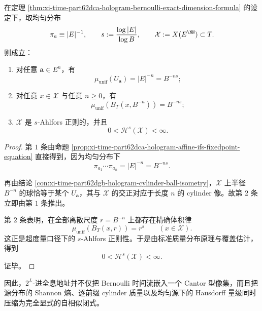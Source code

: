 \begin{corollary}\label{cor:xi-time-part62dca-hologram-uniform-ahlfors-regularity}
在定理 \ref{thm:xi-time-part62dca-hologram-bernoulli-exact-dimension-formula} 的设定下，取均匀分布
\[
\pi_a\equiv |E|^{-1},
\qquad
s:=\frac{\log |E|}{\log B},
\qquad
\mathcal X:=X(E^{\NN})\subset T.
\]
则成立：
\begin{enumerate}
  \item 对任意 \(\mathbf a\in E^n\)，有
        \[
        \mu_{\mathrm{unif}}(U_{\mathbf a})
        =
        |E|^{-n}
        =
        B^{-ns};
        \]
  \item 对任意 \(x\in\mathcal X\) 与任意 \(n\ge 0\)，有
        \[
        \mu_{\mathrm{unif}}(B_T(x,B^{-n}))
        =
        B^{-ns};
        \]
  \item \(\mathcal X\) 是 \(s\)-Ahlfors 正则的，并且
        \[
        0<\mathcal H^s(\mathcal X)<\infty.
        \]
\end{enumerate}
\end{corollary}
\begin{proof}
第 \(1\) 条由命题 \ref{prop:xi-time-part62dca-hologram-affine-ifs-fixedpoint-equation} 直接得到，因为均匀分布下
\[
\pi_{a_1}\cdots \pi_{a_n}=|E|^{-n}=B^{-ns}.
\]

再由结论 \ref{con:xi-time-part62dgb-hologram-cylinder-ball-isometry}，\(\mathcal X\) 上半径 \(B^{-n}\) 的球恰等于某个 \(U_{\mathbf a}\)，其与 \(\mathcal X\) 的交正对应于长度 \(n\) 的 cylinder 像。故第 \(2\) 条立即由第 \(1\) 条推出。

第 \(2\) 条表明，在全部离散尺度 \(r=B^{-n}\) 上都存在精确体积律
\[
\mu_{\mathrm{unif}}(B_T(x,r))=r^s
\qquad (x\in\mathcal X).
\]
这正是超度量口径下的 \(s\)-Ahlfors 正则性。于是由标准质量分布原理与覆盖估计，得到
\[
0<\mathcal H^s(\mathcal X)<\infty.
\]
证毕。
\end{proof}

\noindent
因此，\(2^L\)-进全息地址并不仅把 Bernoulli 时间流嵌入一个 Cantor 型像集，而且把源分布的 Shannon 熵、逐前缀 cylinder 质量以及均匀源下的 Hausdorff 量级同时压缩为完全显式的自相似闭式。

\endinput
